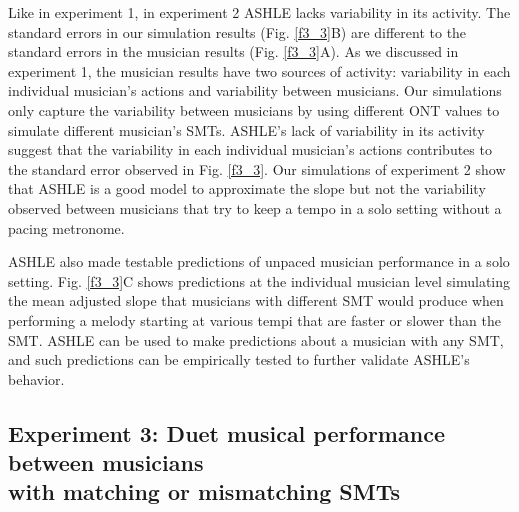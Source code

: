 \documentclass{report}
\begin{document}
Like in experiment 1, in experiment 2 ASHLE lacks variability in its activity. The standard errors in our simulation results (Fig.{} \ref{f3_3}B) are different to the standard errors in the musician results (Fig.{} \ref{f3_3}A). As we discussed in experiment 1, the musician results have two sources of activity: variability in each individual musician's actions and variability between musicians. Our simulations only capture the variability between musicians by using different ONT values to simulate different musician's SMTs. ASHLE's lack of variability in its activity suggest that the variability in each individual musician's actions contributes to the standard error observed in Fig.{} \ref{f3_3}. Our simulations of experiment 2 show that ASHLE is a good model to approximate the slope but not the variability observed between musicians that try to keep a tempo in a solo setting without a pacing metronome.

ASHLE also made testable predictions of unpaced musician performance in a solo setting. Fig.{} \ref{f3_3}C shows predictions at the individual musician level simulating the mean adjusted slope that musicians with different SMT would produce when performing a melody starting at various tempi that are faster or slower than the SMT. ASHLE can be used to make predictions about a musician with any SMT, and such predictions can be empirically tested to further validate ASHLE's behavior.

\subsection{Experiment 3: Duet musical performance between musicians \\ with matching or mismatching SMTs}
\end{document}
